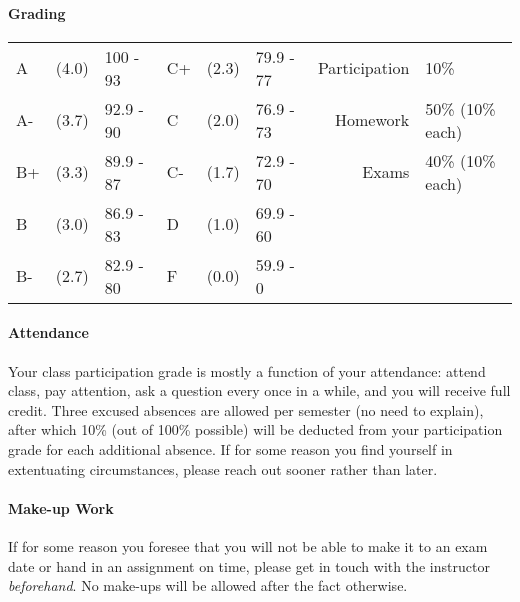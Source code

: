 \documentclass{article}
\begin{document}
  \paragraph{Grading}

      \begin{tabular}{l @{} l l l @{} l l | r l}
        A   & (4.0) & 100 - 93  & C+  & (2.3) & 79.9 - 77 & Participation & 10\%\\
        A-  & (3.7) & 92.9 - 90 & C   & (2.0) & 76.9 - 73 & Homework      & 50\% (10\% each)\\
        B+  & (3.3) & 89.9 - 87 & C-  & (1.7) & 72.9 - 70 & Exams         & 40\% (10\% each)\\
        B   & (3.0) & 86.9 - 83 & D   & (1.0) & 69.9 - 60 & \\
        B-  & (2.7) & 82.9 - 80 & F   & (0.0) & 59.9 - 0  & \\
      \end{tabular}

  \paragraph{Attendance}
    Your class participation grade is mostly a function of your attendance: attend class, pay attention, ask a question every once in a while, and you will receive full credit. Three excused absences are allowed per semester (no need to explain), after which 10\% (out of 100\% possible) will be deducted from your participation grade for each additional absence. If for some reason you find yourself in extentuating circumstances, please reach out sooner rather than later.

  \paragraph{Make-up Work}
    If for some reason you foresee that you will not be able to make it to an exam date or hand in an assignment on time, please get in touch with the instructor \emph{beforehand}. No make-ups will be allowed after the fact otherwise.
\end{document}
